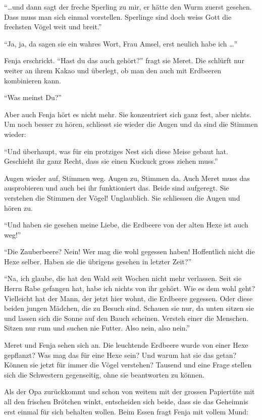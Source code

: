 \enquote{\dots und dann sagt der freche Sperling zu mir, er hätte den Wurm zuerst gesehen. Dass muss man sich einmal vorstellen. Sperlinge sind doch weiss Gott die frechsten Vögel weit und breit.}

\enquote{Ja, ja, da sagen sie ein wahres Wort, Frau Amsel, erst neulich habe ich \dots}

Fenja erschrickt. \enquote{Hast du das auch gehört?} fragt sie Meret. Die schlürft nur weiter an ihrem Kakao und überlegt, ob man den auch mit Erdbeeren kombinieren kann.

\enquote{Was meinst Du?}

Aber auch Fenja hört es nicht mehr. Sie konzentriert sich ganz fest, aber nichts. Um noch besser zu hören, schliesst sie wieder die Augen und da sind die Stimmen wieder:

\enquote{Und überhaupt, was für ein protziges Nest sich diese Meise gebaut hat. Geschieht ihr ganz Recht, dass sie einen Kuckuck gross ziehen muss.}  

Augen wieder auf, Stimmen weg. Augen zu, Stimmen da. Auch Meret muss das ausprobieren und auch bei ihr funktioniert das. Beide sind aufgeregt. Sie verstehen die Stimmen der Vögel! Unglaublich. Sie schliessen die Augen und hören zu.

\enquote{Und haben sie gesehen meine Liebe, die Erdbeere von der alten Hexe ist auch weg!}

\enquote{Die Zauberbeere? Nein! Wer mag die wohl gegessen haben! Hoffentlich nicht die Hexe selber. Haben sie die übrigens gesehen in letzter Zeit?}

\enquote{Na, ich glaube, die hat den Wald seit Wochen nicht mehr verlassen. Seit sie Herrn Rabe gefangen hat, habe ich nichts von ihr gehört. Wie es dem wohl geht? Vielleicht hat der Mann, der jetzt hier wohnt, die Erdbeere gegessen. Oder diese beiden jungen Mädchen, die zu Besuch sind. Schauen sie nur, da unten sitzen sie und lassen sich die Sonne auf den Bauch scheinen. Versteh einer die Menschen. Sitzen nur rum und suchen nie Futter. Also nein, also nein.}

Meret und Fenja sehen sich an. Die leuchtende Erdbeere wurde von einer Hexe gepflanzt? Was mag das für eine Hexe sein? Und warum hat sie das getan? Können sie jetzt für immer die Vögel verstehen? Tausend und eine Frage stellen sich die Schwestern gegenseitig, ohne sie beantworten zu können.

Als der Opa zurückkommt und schon von weitem mit der grossen Papiertüte mit all den frischen Brötchen winkt, entscheiden sich beide, dass sie das Geheimnis erst einmal für sich behalten wollen. Beim Essen fragt Fenja mit vollem Mund:


